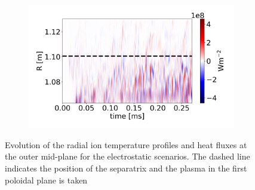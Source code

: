 \begin{figure}[H]
\begin{subfigure}[t]{0.45\textwidth}
	\end{subfigure}
	\begin{subfigure}[t]{0.45\textwidth}
		\centering
		\includegraphics[width=1\textwidth]{schemes/plotOMPtime_spec1_fluxE_psi_PHIJ_mass_1.jpg}
	\end{subfigure}
	\caption{Evolution of the radial ion temperature profiles and heat fluxes at the outer mid-plane for the electrostatic scenarios. The dashed line indicates the position of the separatrix and the plasma in the first poloidal plane is taken}
	\label{fig:CIRC_EI_OMPevolution}
\end{figure}


